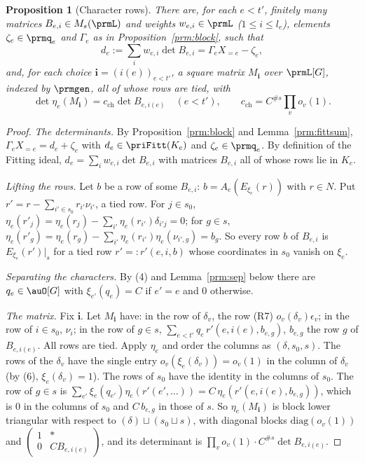 \documentclass[10pt]{amsart}
\newtheorem{proposition}[theorem]{Proposition}
\theoremstyle{definition}
\theoremstyle{remark}
\begin{document}
\begin{proposition}[Character rows]\label{prm:chars}
There are, for each $e<t'$, finitely many matrices $B_{e,i}\in M_s(\prmL)$ and weights $w_{e,i}\in
\prmL$ ($1\le i\le l_e$), elements $\zeta_e\in\prmq_e$ and $\Gamma_e$ as in
Proposition~\ref{prm:block}, such that
\[
d_e:=\sum_iw_{e,i}\det B_{e,i}=\Gamma_eX_{=e}-\zeta_e ,
\]
and, for each choice $\mathbf i=(i(e))_{e<t'}$, a square matrix $M_{\mathbf i}$ over $\prmL[G]$,
indexed by $\prmgen$, all of whose rows are tied, with
\[
\det\eta_e(M_{\mathbf i})=c_{\mathrm{ch}}\det B_{e,i(e)}\quad(e<t'),\qquad c_{\mathrm{ch}}=C^{\#s}\prod_vo_v(1).
\]
\end{proposition}
\begin{proof}
\emph{The determinants.} By Proposition~\ref{prm:block} and Lemma~\ref{prm:fittsum}, $\Gamma_eX_{=e}=
d_e+\zeta_e$ with $d_e\in\priFitt(K_e)$ and $\zeta_e\in\prmq_e$. By definition of the Fitting ideal,
$d_e=\sum_iw_{e,i}\det B_{e,i}$ with matrices $B_{e,i}$ all of whose rows lie in $K_e$.

\emph{Lifting the rows.} Let $b$ be a row of some $B_{e,i}$: $b=A_e(E_{\xi_e}(r))$ with $r\in N$. Put
$r'=r-\sum_{i'\in s_0}r_{i'}\nu_{i'}$, a tied row. For $j\in s_0$, $\eta_e(r'_j)=\eta_e(r_j)-
\sum_{i'}\eta_e(r_{i'})\delta_{i'j}=0$; for $g\in s$, $\eta_e(r'_g)=\eta_e(r_g)-\sum_{i'}\eta_e(r_{i'})
\eta_e(\nu_{i',g})=b_g$. So every row $b$ of $B_{e,i}$ is $E_{\xi_e}(r')|_s$ for a tied row $r'=:r'(e,i,b)$
whose coordinates in $s_0$ vanish on $\xi_e$.

\emph{Separating the characters.} By (4) and Lemma~\ref{prm:sep} below there are $q_e\in\auO[G]$ with
$\xi_{e'}(q_e)=C$ if $e'=e$ and $0$ otherwise.

\emph{The matrix.} Fix $\mathbf i$. Let $M_{\mathbf i}$ have: in the row of $\delta_v$, the row (R7)
$o_v(\delta_v)\epsilon_v$; in the row of $i\in s_0$, $\nu_i$; in the row of $g\in s$, $\sum_{e<t'}q_e\,
r'(e,i(e),b_{e,g})$, $b_{e,g}$ the row $g$ of $B_{e,i(e)}$. All rows are tied. Apply $\eta_e$ and order
the columns as $(\delta,s_0,s)$. The rows of the $\delta_v$ have the single entry $o_v(\xi_e(\delta_v))=
o_v(1)$ in the column of $\delta_v$ (by (6), $\xi_e(\delta_v)=1$). The rows of $s_0$ have the identity
in the columns of $s_0$. The row of $g\in s$ is $\sum_{e'}\xi_e(q_{e'})\eta_e(r'(e',\dots))=
C\,\eta_e(r'(e,i(e),b_{e,g}))$, which is $0$ in the columns of $s_0$ and $C\,b_{e,g}$ in those of $s$. So
$\eta_e(M_{\mathbf i})$ is block lower triangular with respect to $(\delta)\sqcup(s_0\sqcup s)$, with
diagonal blocks $\mathrm{diag}(o_v(1))$ and $\left(\begin{smallmatrix}1&*\\0&CB_{e,i(e)}\end{smallmatrix}
\right)$, and its determinant is $\prod_vo_v(1)\cdot C^{\#s}\det B_{e,i(e)}$.
\end{proof}
\end{document}
